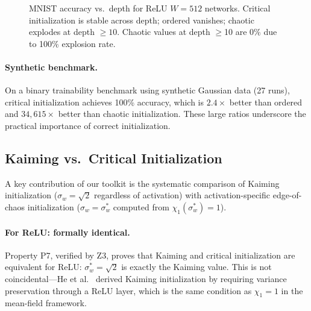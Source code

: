\documentclass[10pt]{article}
\begin{document}
\begin{figure}[t]
\centering
{}
\caption{MNIST accuracy vs.\ depth for ReLU $W\!=\!512$ networks.  Critical initialization is stable across depth; ordered vanishes; chaotic explodes at depth $\geq 10$.  Chaotic values at depth $\geq$10 are 0\% due to 100\% explosion rate.}
\label{fig:depth-accuracy}
\end{figure}

\paragraph{Synthetic benchmark.}
On a binary trainability benchmark using synthetic Gaussian data (27 runs), critical initialization achieves 100\% accuracy, which is $2.4\times$ better than ordered and $34{,}615\times$ better than chaotic initialization.
These large ratios underscore the practical importance of correct initialization.

\subsection{Kaiming vs.\ Critical Initialization}
\label{sec:kaiming}

A key contribution of our toolkit is the systematic comparison of Kaiming initialization ($\sigma_w = \sqrt{2}$ regardless of activation) with activation-specific edge-of-chaos initialization ($\sigma_w = \sigma_w^*$ computed from $\chi_1(\sigma_w^*) = 1$).

\paragraph{For ReLU: formally identical.}
Property P7, verified by Z3, proves that Kaiming and critical initialization are equivalent for ReLU: $\sigma_w^* = \sqrt{2}$ is exactly the Kaiming value.
This is not coincidental---He et al.~\cite{he2015delving} derived Kaiming initialization by requiring variance preservation through a ReLU layer, which is the same condition as $\chi_1 = 1$ in the mean-field framework.
\end{document}
